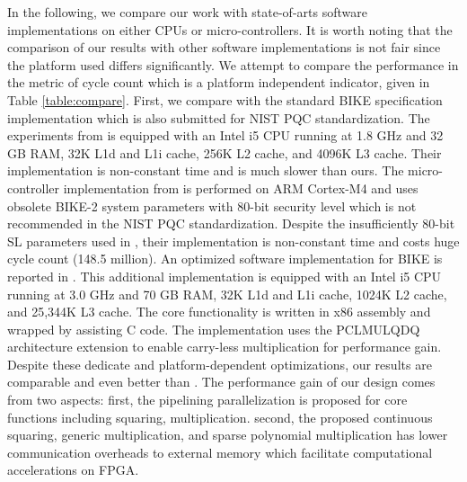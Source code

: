 \documentclass[runningheads]{llncs}
\begin{document}
In the following, we compare our work with state-of-arts software implementations on either CPUs or micro-controllers. It is worth noting that the comparison of our results with other software implementations is not fair since the platform used differs significantly. We attempt to compare the performance in the metric of cycle count which is a platform independent indicator, given in Table \ref{table:compare}.
First, we compare with the standard BIKE specification implementation \cite{aragon2017bike} which is also submitted for NIST PQC standardization. The experiments from \cite{von2014lightweight} is equipped with an Intel i5 CPU running at 1.8 GHz and 32 GB RAM, 32K L1d and L1i cache, 256K L2 cache, and 4096K L3 cache. Their implementation is non-constant time and is much slower than ours. The micro-controller implementation from \cite{maurich2015implementing} is performed on ARM Cortex-M4 and uses obsolete BIKE-2 system parameters with 80-bit security level which is not recommended in the NIST PQC standardization. Despite the insufficiently 80-bit SL parameters used in \cite{maurich2015implementing}, their implementation is non-constant time and costs huge cycle count (148.5 million).  An optimized software implementation for BIKE is reported in \cite{drucker2017toolbox}. This additional implementation is equipped with an Intel i5 CPU running at 3.0 GHz and 70 GB RAM, 32K L1d and L1i cache, 1024K L2 cache, and 25,344K L3 cache. The core functionality is written in x86 assembly and wrapped by assisting C code.
The implementation uses the PCLMULQDQ architecture extension to enable carry-less multiplication for performance gain. Despite these dedicate and platform-dependent optimizations, our results are comparable and even better than \cite{drucker2017toolbox}. The performance gain of our design comes from two aspects: first, the pipelining parallelization is proposed for core functions including squaring, multiplication. second, the proposed continuous squaring, generic multiplication, and sparse polynomial multiplication has lower communication overheads to external memory which facilitate computational accelerations on FPGA.
\end{document}
